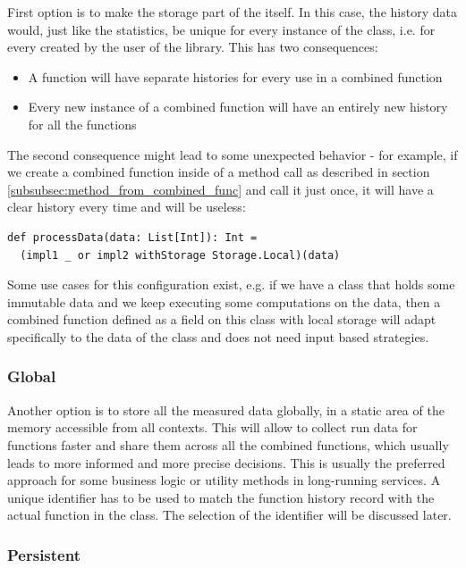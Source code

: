 First option is to make the storage part of the  itself. In this case, the history data would, just like the statistics, be unique for every instance of the class, i.e. for every  created by the user of the library. This has two consequences:

\begin{itemize}
	\item A function will have separate histories for every use in a combined function
	\item Every new instance of a combined function will have an entirely new history for all the functions
\end{itemize}

The second consequence might lead to some unexpected behavior - for example, if we create a combined function inside of a method call as described in section \ref{subsubsec:method_from_combined_func} and call it just once, it will have a clear history every time and will be useless:

\lstset{style=Scala}
\begin{lstlisting}
def processData(data: List[Int]): Int = 
  (impl1 _ or impl2 withStorage Storage.Local)(data)
\end{lstlisting}

Some use cases for this configuration exist, e.g. if we have a class that holds some immutable data and we keep executing some computations on the data, then a combined function defined as a field on this class with local storage will adapt specifically to the data of the class and does not need input based strategies.

\subsubsection{Global}

Another option is to store all the measured data globally, in a static area of the memory accessible from all contexts. This will allow to collect run data for functions faster and share them across all the combined functions, which usually leads to more informed and more precise decisions. This is usually the preferred approach for some business logic or utility methods in long-running services. A unique identifier has to be used to match the function history record with the actual function in the  class. The selection of the identifier will be discussed later.

\subsubsection{Persistent}

